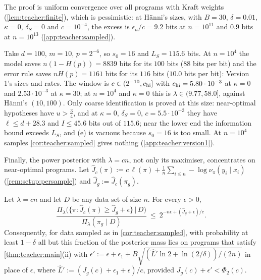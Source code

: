 The proof is uniform convergence over all programs with Kraft weights (\cref{lem:teacher:finite}), which is pessimistic: at H\"anni's sizes, with $B=30$, $\delta=0.01$, $\kappa=0$, $\delta_S=0$ and $c=10^{-4}$, the excess is $\epsilon_n/c=9.2$ bits at $n=10^{11}$ and $0.9$ bits at $n=10^{13}$ (\cref{app:teacher:sampled}).

\begin{example}\label{ex:teacher:version1}
Take $d=100$, $m=10$, $p=2^{-6}$, so $s_0=16$ and $L_S=115.6$ bits. At $n=10^4$ the model saves $n(1-H(p))=8839$ bits for its $100$ bits ($88$ bits per bit) and the error rule saves $nH(p)=1161$ bits for its $116$ bits ($10.0$ bits per bit): Version 1's sizes and rates. The window is $c\in(2^{-10},c_{\rm hi}]$ with $c_{\rm hi}=5.80\cdot10^{-3}$ at $\kappa=0$ and $2.53\cdot10^{-3}$ at $\kappa=30$; at $n=10^4$ and $\kappa=0$ this is $\lambda\in(9.77,58.0]$, against H\"anni's $(10,100)$. Only coarse identification is proved at this size: near-optimal hypotheses have $u>\frac34$, and at $\kappa=0$, $\delta_S=0$, $c=5.5\cdot10^{-3}$ they have $\ell\le d+28.3$ and $I\le45.6$ bits out of $115.6$; near the lower end the information bound exceeds $L_S$, and (e) is vacuous because $s_0=16$ is too small. At $n=10^4$ samples \cref{cor:teacher:sampled} gives nothing (\cref{app:teacher:version1}).
\end{example}

Finally, the power posterior with $\lambda=cn$, not only its maximiser, concentrates on near-optimal programs. Let $\hat J_c(\pi):=c\,\ell(\pi)+\frac1n\sum_{i\le n}-\log\nu_\pi(y_i\mid x_i)$ (\cref{rem:setup:persample}) and $\hat J_g:=\hat J_c(\pi_g)$.

\begin{proposition}\label{prop:teacher:concentration}
Let $\lambda=cn$ and let $D$ be any data set of size $n$. For every $\epsilon>0$,
\[
\frac{\Pi_\lambda\big(\{\pi:\hat J_c(\pi)\ge\hat J_g+\epsilon\}\,\big|\,D\big)}{\Pi_\lambda(\pi_g\mid D)}\ \le\ 2^{-n\epsilon+(\hat J_g+\epsilon)/c}.
\]
Consequently, for data sampled as in \cref{cor:teacher:sampled}, with probability at least $1-\delta$ all but this fraction of the posterior mass lies on programs that satisfy \cref{thm:teacher:main}(ii) with $\epsilon':=\epsilon+\epsilon_1+B\sqrt{(\hat L'\ln2+\ln(2/\delta))/(2n)}$ in place of $\epsilon$, where $\hat L':=(J_g(c)+\epsilon_1+\epsilon)/c$, provided $J_g(c)+\epsilon'<\Phi_2(c)$.
\end{proposition}

